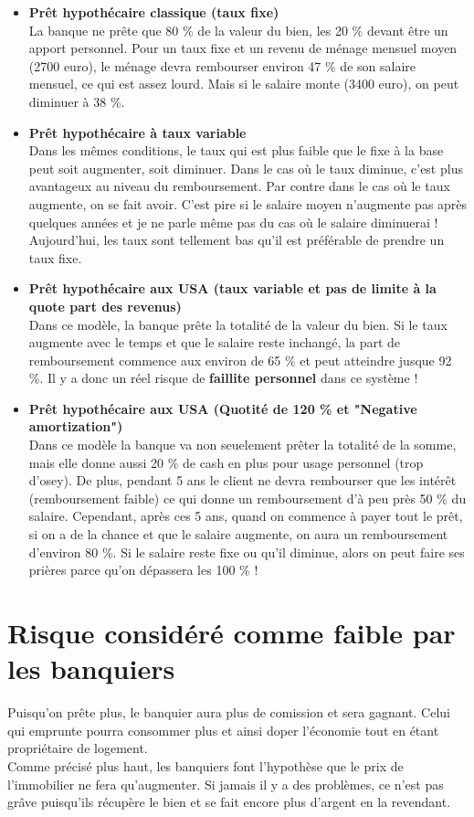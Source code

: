 \begin{itemize}
\item \textbf{Prêt hypothécaire classique (taux fixe)}\\
La banque ne prête que 80 \% de la valeur du bien, les 20 \% devant être un apport personnel. Pour un taux fixe et un revenu de ménage mensuel moyen (2700 euro), le ménage devra rembourser environ 47 \% de son salaire mensuel, ce qui est assez lourd. Mais si le salaire monte (3400 euro), on peut diminuer à 38 \%. 

\item \textbf{Prêt hypothécaire à taux variable}\\
Dans les mêmes conditions, le taux qui est plus faible que le fixe à la base peut soit augmenter, soit diminuer. Dans le cas où le taux diminue, c'est plus avantageux au niveau du remboursement. Par contre dans le cas où le taux augmente, on se fait avoir. C'est pire si le salaire moyen n'augmente pas après quelques années et je ne parle même pas du cas où le salaire diminuerai ! Aujourd'hui, les taux sont tellement bas qu'il est préférable de prendre un taux fixe.

\item \textbf{Prêt hypothécaire aux USA (taux variable et pas de limite à la quote part des revenus)}\\
Dans ce modèle, la banque prête la totalité de la valeur du bien. Si le taux augmente avec le temps et que le salaire reste inchangé, la part de remboursement commence aux environ de 65 \% et peut atteindre jusque 92 \%. Il y a donc un réel risque de \textbf{faillite personnel} dans ce système !

\item \textbf{Prêt hypothécaire aux USA (Quotité de 120 \% et "Negative amortization")}\\
Dans ce modèle la banque va non seuelement prêter la totalité de la somme, mais elle donne aussi 20 \% de cash en plus pour usage personnel (trop d'osey). De plus, pendant 5 ans le client ne devra rembourser que les intérêt (remboursement faible) ce qui donne un remboursement d'à peu près 50 \% du salaire. Cependant, après ces 5 ans, quand on commence à payer tout le prêt, si on a de la chance et que le salaire augmente, on aura un remboursement d'environ 80 \%. Si le salaire reste fixe ou qu'il diminue, alors on peut faire ses prières parce qu'on dépassera les 100 \% !
\end{itemize}


\section{Risque considéré comme faible par les banquiers}
Puisqu'on prête plus, le banquier aura plus de comission et sera gagnant. Celui qui emprunte pourra consommer plus et ainsi doper l'économie tout en étant propriétaire de logement. \\
Comme précisé plus haut, les banquiers font l'hypothèse que le prix de l'immobilier ne fera qu'augmenter. Si jamais il y a des problèmes, ce n'est pas grâve puisqu'ils récupère le bien et se fait encore plus d'argent en la revendant.\\


